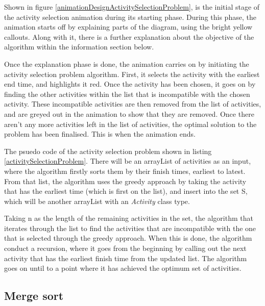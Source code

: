 Shown in figure \ref{animationDesignActivitySelectionProblem}, is the initial stage of the activity selection animation during its starting phase. During this phase, the animation starts off by explaining parts of the diagram, using the bright yellow callouts. Along with it, there is a further explanation about the objective of the algorithm within the information section below.

Once the explanation phase is done, the animation carries on by initiating the activity selection problem algorithm. First, it selects the activity with the earliest end time, and highlights it red. Once the activity has been chosen, it goes on by finding the other activities within the list that is incompatible with the chosen activity. These incompatible activities are then removed from the list of activities, and are greyed out in the animation to show that they are removed. Once there aren't any more activities left in the list of activities, the optimal solution to the problem has been finalised. This is when the animation ends. 

\newpage



The psuedo code of the activity selection problem shown in listing \ref{activitySelectionProblem}. There will be an arrayList of activities as an input, where the algorithm firstly sorts them by their finish times, earliest to latest. From that list, the algorithm uses the greedy approach by taking the activity that has the earliest time (which is first on the list), and insert into the set S, which will be another arrayList with an \textit{Activity} class type. 

Taking n as the length of the remaining activities in the set, the algorithm that iterates through the list to find the activities that are incompatible with the one that is selected through the greedy approach. When this is done, the algorithm conduct a recursion, where it goes from the beginning by calling out the next activity that has the earliest finish time from the updated list. The algorithm goes on until to a point where it has achieved the optimum set of activities.


\subsection{Merge sort}


